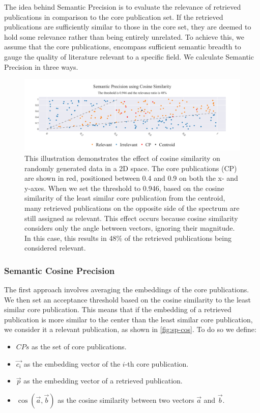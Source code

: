 The idea behind Semantic Precision is to evaluate the relevance of retrieved publications in comparison to the core publication set. If the retrieved publications are sufficiently similar to those in the core set, they are deemed to hold some relevance rather than being entirely unrelated. To achieve this, we assume that the core publications, encompass sufficient semantic breadth to gauge the quality of literature relevant to a specific field. We calculate Semantic Precision in three ways.

\begin{figure}[]
	\centering	
	\includegraphics[scale=0.4]{pics/sp_cos.pdf}
	\caption[Semantic Precision using Cosine Similarity]{This illustration demonstrates the effect of cosine similarity on randomly generated data in a 2D space. The core publications (CP) are shown in red, positioned between 0.4 and 0.9 on both the x- and y-axes. When we set the threshold to 0.946, based on the cosine similarity of the least similar core publication from the centroid, many retrieved publications on the opposite side of the spectrum are still assigned as relevant. This effect occurs because cosine similarity considers only the angle between vectors, ignoring their magnitude. In this case, this results in 48\% of the retrieved publications being considered relevant.}

	\label{fig:sp-cos}
\end{figure}

\subsubsection{Semantic Cosine Precision}

The first approach involves averaging the embeddings of the core publications. We then set an acceptance threshold based on the cosine similarity to the least similar core publication. This means that if the embedding of a retrieved publication is more similar to the center than the least similar core publication, we consider it a relevant publication, as shown in \autoref{fig:sp-cos}. To do so we define:
\begin{itemize}
	\item $CPs$ as the set of core publications.
	\item $\vec{c_i}$ as the embedding vector of the $i$-th core publication.
	\item $\vec{p}$ as the embedding vector of a retrieved publication.
	\item $\cos(\vec{a}, \vec{b})$ as the cosine similarity between two vectors $\vec{a}$ and $\vec{b}$.
\end{itemize}

